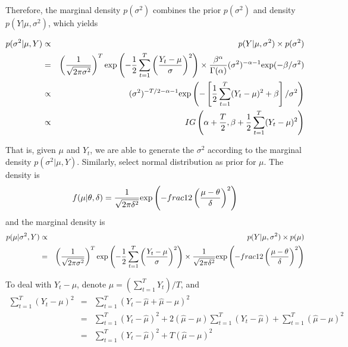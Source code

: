 \documentclass[11pt,reqno,final]{amsart}
\def\exp{\hbox{\rm exp}}
\begin{document}
Therefore, the marginal density $p(\sigma^2)$ combines the prior $p(\sigma^2)$ and density $p(Y|\mu, \sigma^2)$, which yields

\begin{eqnarray*}
p(\sigma^2|\mu, Y)  &\propto& p(Y|\mu,\sigma^2) \times p(\sigma^2) \\
                    &=& \left( \frac{1}{\sqrt{2\pi\sigma^2}} \right)^T \exp\left( -\frac{1}{2} \sum_{t=1}^{T} \left( \frac{Y_t - \mu}{\sigma}\right)^2 \right) \times \frac{\beta^{\alpha}}{\Gamma(\alpha)} (\sigma^2)^{-\alpha-1} \exp(-\beta/\sigma^2) \\
                    &\propto& (\sigma^2)^{-T/2-\alpha-1} \exp\left( -\left[\frac{1}{2}\sum_{t=1}^{T} (Y_t-\mu)^2 + \beta \right]/\sigma^2 \right) \\
                    &\propto& IG\left(\alpha+\frac{T}{2}, \beta+\frac{1}{2}\sum_{t=1}^{T}(Y_t-\mu)^2 \right)
\end{eqnarray*}

That is, given $\mu$ and $Y_t$, we are able to generate the $\sigma^2$ according to the marginal density $p(\sigma^2|\mu, Y)$. Similarly, select normal distribution as prior for $\mu$. The density is
$$
f(\mu|\theta,\delta) = \frac{1}{\sqrt{2\pi\delta^2}} \exp\left( -frac{1}{2} \left( \frac{\mu-\theta}{\delta} \right)^2 \right)
$$
and the marginal density is
\begin{eqnarray*}
p(\mu|\sigma^2, Y)  &\propto& p(Y|\mu,\sigma^2) \times p(\mu) \\
                    &=& \left( \frac{1}{\sqrt{2\pi\sigma^2}} \right)^T \exp\left( -\frac{1}{2} \sum_{t=1}^{T} \left( \frac{Y_t - \mu}{\sigma}\right)^2 \right) \times \frac{1}{\sqrt{2\pi\delta^2}} \exp\left( -frac{1}{2} \left( \frac{\mu-\theta}{\delta} \right)^2 \right)
\end{eqnarray*}

To deal with $Y_t - \mu$, denote $\hat{\mu}=\left( \sum_{t=1}^T Y_t \right)/T$, and
\begin{eqnarray*}
\sum_{t=1}^T (Y_t - \mu)^2 &=&  \sum_{t=1}^T (Y_t - \hat{\mu} + \hat{\mu} - \mu)^2 \\
                           &=&  \sum_{t=1}^T (Y_t - \hat{\mu})^2 + 2(\hat{\mu}-\mu)\sum_{t=1}^T(Y_t-\hat{\mu}) + \sum_{t=1}^T(\hat{\mu} - \mu)^2 \\
                           &=&  \sum_{t=1}^T (Y_t - \hat{\mu})^2 + T(\hat{\mu}-\mu)^2
\end{eqnarray*}
\end{document}
